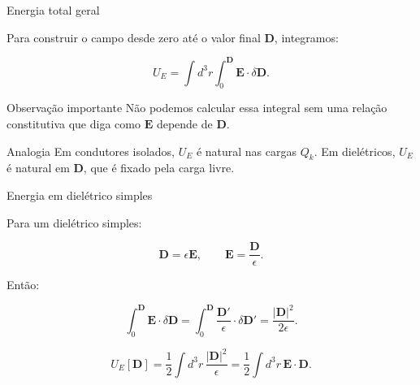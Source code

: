 \documentclass[aspectratio=169]{beamer}
\begin{document}
\begin{frame}{Energia total geral}

\small

Para construir o campo desde zero até o valor final \(\mathbf D\), integramos:

\begin{eqbox}
\begin{equation}
U_E
=
\int d^3r
\int_0^{\mathbf D}
\mathbf E\cdot\delta\mathbf D.
\tag{6.91}
\label{eq:energia-geral-dieletrico}
\end{equation}
\end{eqbox}

\begin{mybox}{Observação importante}
Não podemos calcular essa integral sem uma relação constitutiva que diga como
\(\mathbf E\) depende de \(\mathbf D\).
\end{mybox}

\begin{alertblock}{Analogia}
Em condutores isolados, \(U_E\) é natural nas cargas \(Q_k\). Em dielétricos,
\(U_E\) é natural em \(\mathbf D\), que é fixado pela carga livre.
\end{alertblock}

\end{frame}

\begin{frame}{Energia em dielétrico simples}

\small

Para um dielétrico simples:

\[
\mathbf D=\epsilon\mathbf E,
\qquad
\mathbf E=\frac{\mathbf D}{\epsilon}.
\]

Então:

\[
\int_0^{\mathbf D}\mathbf E\cdot\delta\mathbf D
=
\int_0^{\mathbf D}
\frac{\mathbf D'}{\epsilon}\cdot\delta\mathbf D'
=
\frac{|\mathbf D|^2}{2\epsilon}.
\]

\begin{eqbox}
\begin{equation}
U_E[\mathbf D]
=
\frac{1}{2}
\int d^3r\,\frac{|\mathbf D|^2}{\epsilon}
=
\frac{1}{2}\int d^3r\,\mathbf E\cdot\mathbf D.
\tag{6.94}
\label{eq:energia-simple}
\end{equation}
\end{eqbox}

\end{frame}
\end{document}
